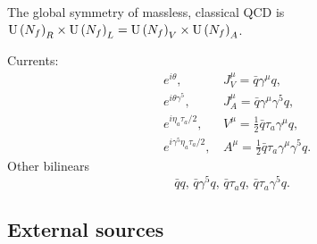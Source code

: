 The global symmetry of massless, classical QCD is $\text{U}\left(N_f\right)_R \times \text{U}\left(N_f\right)_L = \text{U}\left(N_f\right)_V \times \text{U}\left(N_f\right)_A$.


Currents:
%
\begin{align}
    &e^{i\theta}, \, 
    &J_V^\mu 
    = \bar q \gamma^\mu q, \\
    &e^{i\theta\gamma^5}, \, 
    &J_A^\mu = \bar q \gamma^\mu \gamma^5 q, \\
    &e^{i\eta_a \tau_a/2}, \, 
    &V^\mu = \frac{1}{2} \bar q \tau_a \gamma^\mu q, \\
    &e^{i\gamma^5 \eta_a \tau_a/2}, \, 
    & A^\mu = \frac{1}{2} \bar q \tau_a \gamma^\mu \gamma^5 q.
\end{align}
%
Other bilinears
%
\begin{equation}
    \bar q q,\, \bar q\gamma^5 q,\, \bar q \tau_a q, \, \bar q \tau_a \gamma^5 q. 
\end{equation}

\subsection{External sources}

